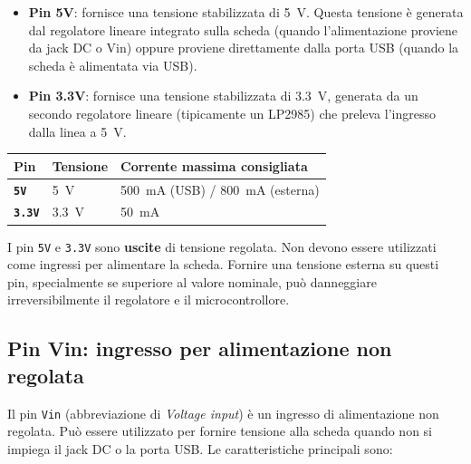 \begin{itemize}
    \item \textbf{Pin 5V}: fornisce una tensione stabilizzata di \SI{5}{\volt}. Questa tensione è generata dal regolatore lineare integrato sulla scheda (quando l'alimentazione proviene da jack DC o Vin) oppure proviene direttamente dalla porta USB (quando la scheda è alimentata via USB).

    \item \textbf{Pin 3.3V}: fornisce una tensione stabilizzata di \SI{3.3}{\volt}, generata da un secondo regolatore lineare (tipicamente un LP2985) che preleva l'ingresso dalla linea a \SI{5}{\volt}. 
\end{itemize}

\begin{center}
\begin{tabular}{>{\bfseries}l l l}
    \toprule
    Pin & Tensione & Corrente massima consigliata \\
    \midrule
    \texttt{5V}  & \SI{5}{\volt}  & \SI{500}{\milli\ampere} (USB) / \SI{800}{\milli\ampere} (esterna) \\
    \texttt{3.3V} & \SI{3.3}{\volt} & \SI{50}{\milli\ampere} \\
    \bottomrule
\end{tabular}
\end{center}

\begin{tcolorbox}[colback=red!4, colframe=red!60, title=\textbf{Attenzione – Non fornire tensione sui pin 5V o 3.3V}]
    I pin \texttt{5V} e \texttt{3.3V} sono \textbf{uscite} di tensione regolata. Non devono essere utilizzati come ingressi per alimentare la scheda. Fornire una tensione esterna su questi pin, specialmente se superiore al valore nominale, può danneggiare irreversibilmente il regolatore e il microcontrollore.
\end{tcolorbox}

\subsection*{Pin Vin: ingresso per alimentazione non regolata}

Il pin \texttt{Vin} (abbreviazione di \textit{Voltage input}) è un ingresso di alimentazione non regolata. Può essere utilizzato per fornire tensione alla scheda quando non si impiega il jack DC o la porta USB. Le caratteristiche principali sono:

